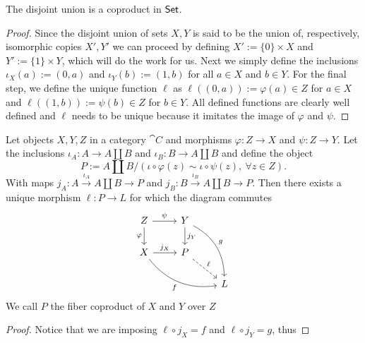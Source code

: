 \begin{proposition}
   The disjoint union is a coproduct in \(\mathsf{Set}\).
\end{proposition}

\begin{proof}
    Since the disjoint union of sets \(X, Y\) is said to be the union of,
    respectively, isomorphic copies \(X', Y'\) we can proceed by defining  \(X'
    := \{0\} \times X\) and \(Y' := \{1\} \times Y\), which will do the work
    for us. Next we simply define the inclusions \(\iota_X(a) := (0, a)\) and
    \(\iota_Y(b) := (1, b)\) for all \(a \in X\) and \(b \in Y\). For the final
    step, we define the unique function \(\ell\) as \(\ell((0,a)) := \varphi(a)
    \in Z\) for \(a \in X\) and \(\ell((1, b)) := \psi(b) \in Z\)  for \(b \in
    Y\). All defined functions are clearly well defined and \(\ell\) needs to be
    unique because it imitates the image of \(\varphi\) and \(\psi\).
\end{proof}

\begin{proposition}
   Let objects \(X, Y, Z\) in a category \(\cat C\) and morphisms \(\varphi : Z
   \to X\) and \(\psi : Z \to Y\). Let the inclusions \(\iota_A : A \to A \amalg
   B\) and  \(\iota_B: B \to A \amalg B\) and define the object 
    \[
       P := A \amalg B / (\iota \circ \varphi(z) \sim \iota \circ \psi(z),\
       \forall z \in Z).
   \] 
   With maps \(j_A : A \xrightarrow{\iota_A} A \amalg B \to P\) and  \(j_B : B
   \xrightarrow{\iota_B} A \amalg B \to P\). Then there exists a unique morphism
    \(\ell : P \to L\) for which the diagram commutes
     \[
       \begin{tikzcd}
         Z
         \ar[r, "\psi"]
         \ar[d, swap, "\varphi"]
           &Y
           \ar[d, "j_Y"]
           \ar[ddr, bend left, "g"]
             &\\
         X
         \ar[r, "j_X"]
         \ar[drr, bend right, swap, "f"]
           &P
           \ar[dr, dashed, "\ell"]
             &\\
           &
             &L
       \end{tikzcd}
    \] 
    We call \(P\) the fiber coproduct of \(X\) and \(Y\) over \(Z\)
\end{proposition}

\begin{proof}
   Notice that we are imposing \(\ell \circ j_X = f\) and \(\ell \circ j_Y =
   g\), thus  
\end{proof}
